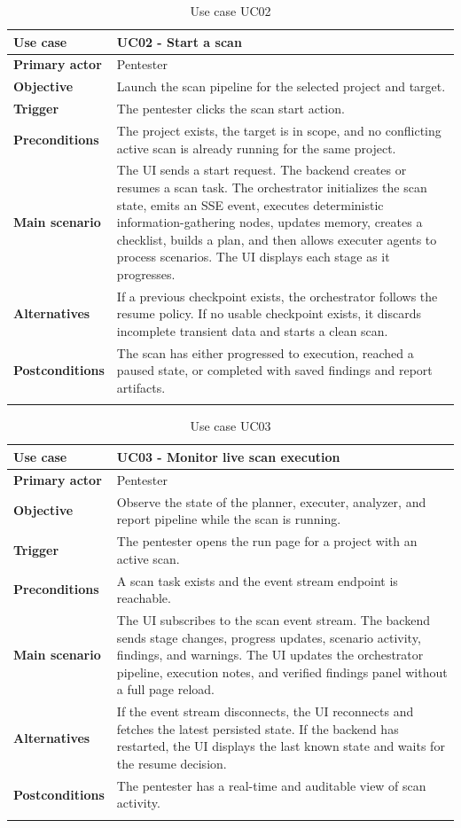 \documentclass[12pt,a4paper]{report}
\begin{document}
\begin{longtable}{|p{}|p{}|}
\hline
\textbf{Use case} & UC02 - Start a scan \\
\hline
\textbf{Primary actor} & Pentester \\
\hline
\textbf{Objective} & Launch the scan pipeline for the selected project and target. \\
\hline
\textbf{Trigger} & The pentester clicks the scan start action. \\
\hline
\textbf{Preconditions} & The project exists, the target is in scope, and no conflicting
active scan is already running for the same project. \\
\hline
\textbf{Main scenario} &
The UI sends a start request. The backend creates or resumes a scan task. The
orchestrator initializes the scan state, emits an SSE event, executes deterministic
information-gathering nodes, updates memory, creates a checklist, builds a plan, and
then allows executer agents to process scenarios. The UI displays each stage as it
progresses. \\
\hline
\textbf{Alternatives} & If a previous checkpoint exists, the orchestrator follows the
resume policy. If no usable checkpoint exists, it discards incomplete transient data
and starts a clean scan. \\
\hline
\textbf{Postconditions} & The scan has either progressed to execution, reached a paused
state, or completed with saved findings and report artifacts. \\
\hline
\caption{Use case UC02}
\label{tab:uc02}
\end{longtable}

\begin{longtable}{|p{}|p{}|}
\hline
\textbf{Use case} & UC03 - Monitor live scan execution \\
\hline
\textbf{Primary actor} & Pentester \\
\hline
\textbf{Objective} & Observe the state of the planner, executer, analyzer, and report
pipeline while the scan is running. \\
\hline
\textbf{Trigger} & The pentester opens the run page for a project with an active scan. \\
\hline
\textbf{Preconditions} & A scan task exists and the event stream endpoint is reachable. \\
\hline
\textbf{Main scenario} &
The UI subscribes to the scan event stream. The backend sends stage changes, progress
updates, scenario activity, findings, and warnings. The UI updates the orchestrator
pipeline, execution notes, and verified findings panel without a full page reload. \\
\hline
\textbf{Alternatives} & If the event stream disconnects, the UI reconnects and fetches
the latest persisted state. If the backend has restarted, the UI displays the last
known state and waits for the resume decision. \\
\hline
\textbf{Postconditions} & The pentester has a real-time and auditable view of scan
activity. \\
\hline
\caption{Use case UC03}
\label{tab:uc03}
\end{longtable}
\end{document}
